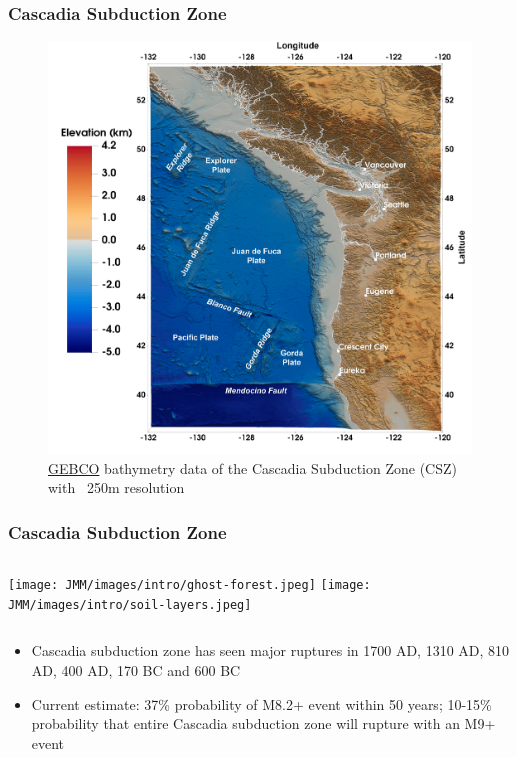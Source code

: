 


\begin{frame}
    \frametitle{Cascadia Subduction Zone}
    \begin{figure}
        \includegraphics[width=\textwidth]{JMM/images/meshes/CSZ-lat-lon-4k-with-labels-min.png}
        \caption{\href{https://www.gebco.net/data_and_products/gridded_bathymetry_data/}{GEBCO} bathymetry data of the Cascadia Subduction Zone (CSZ) with ~250m resolution}
    \end{figure}
\end{frame}

\begin{frame}
    \frametitle{Cascadia Subduction Zone}
    \begin{columns}
        \texttt{[image: JMM/images/intro/ghost-forest.jpeg]}
        \texttt{[image: JMM/images/intro/soil-layers.jpeg]}
    \end{columns}
    \caption{Left: Neskowin Ghost Forest; Right: Soil layers in pit (Tofino, BC)}
    \begin{itemize}
        \item Cascadia subduction zone has seen major ruptures in 1700 AD, 1310 AD, 810 AD, 400 AD, 170 BC and 600 BC
        \item Current estimate: 37\% probability of M8.2+ event within 50 years; 10-15\% probability that entire Cascadia subduction zone will rupture with an M9+ event
    \end{itemize}
\end{frame}

